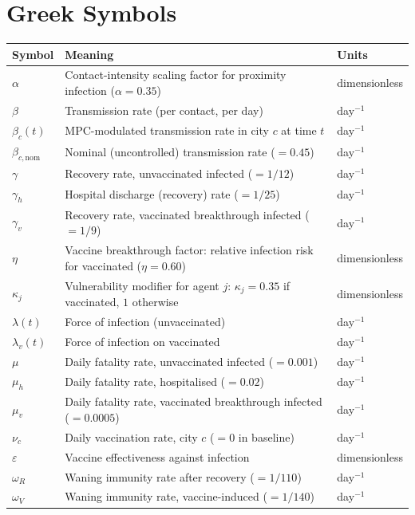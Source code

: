 \bigskip
\section*{Greek Symbols}

\begin{tabular}{@{}lll@{}}
\toprule
\textbf{Symbol} & \textbf{Meaning} & \textbf{Units} \\
\midrule
$\alpha$    & Contact-intensity scaling factor for proximity infection ($\alpha=0.35$) & dimensionless \\
$\beta$     & Transmission rate (per contact, per day)                         & day$^{-1}$ \\
$\beta_c(t)$& MPC-modulated transmission rate in city $c$ at time $t$          & day$^{-1}$ \\
$\beta_{c,\mathrm{nom}}$ & Nominal (uncontrolled) transmission rate ($=0.45$) & day$^{-1}$ \\
$\gamma$    & Recovery rate, unvaccinated infected ($=1/12$)                   & day$^{-1}$ \\
$\gamma_h$  & Hospital discharge (recovery) rate ($=1/25$)                      & day$^{-1}$ \\
$\gamma_v$  & Recovery rate, vaccinated breakthrough infected ($=1/9$)         & day$^{-1}$ \\
$\eta$      & Vaccine breakthrough factor: relative infection risk for vaccinated ($\eta=0.60$) & dimensionless \\
$\kappa_j$  & Vulnerability modifier for agent $j$: $\kappa_j=0.35$ if vaccinated, $1$ otherwise & dimensionless \\
$\lambda(t)$& Force of infection (unvaccinated)                                & day$^{-1}$ \\
$\lambda_v(t)$ & Force of infection on vaccinated                              & day$^{-1}$ \\
$\mu$       & Daily fatality rate, unvaccinated infected ($=0.001$)            & day$^{-1}$ \\
$\mu_h$     & Daily fatality rate, hospitalised ($=0.02$)                       & day$^{-1}$ \\
$\mu_v$     & Daily fatality rate, vaccinated breakthrough infected ($=0.0005$)& day$^{-1}$ \\
$\nu_c$     & Daily vaccination rate, city $c$ ($=0$ in baseline)              & day$^{-1}$ \\
$\varepsilon$ & Vaccine effectiveness against infection                        & dimensionless \\
$\omega_R$  & Waning immunity rate after recovery ($=1/110$)                   & day$^{-1}$ \\
$\omega_V$  & Waning immunity rate, vaccine-induced ($=1/140$)                 & day$^{-1}$ \\
\bottomrule
\end{tabular}

